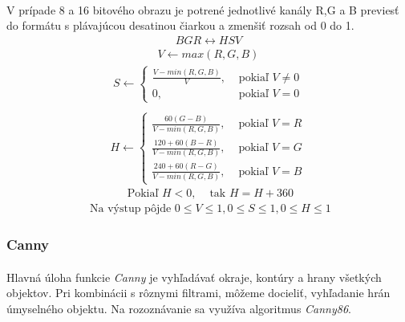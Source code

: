 \documentclass[12pt]{article}
\begin{document}
\paragraph{} 
V prípade 8 a 16 bitového obrazu je potrené jednotlivé kanály R,G a B previesť do formátu s plávajúcou desatinou čiarkou a zmenšiť rozsah od 0 do 1.
\begin{align*}
BGR \leftrightarrow HSV
\end{align*}
\begin{align*}
V \leftarrow max(R,G,B)
\end{align*}
\begin{align*}
S \leftarrow \begin{cases} \frac{V - min(R,G,B)}{V}, & \text{ pokiaľ } V \neq 0 \\ 0, & \text{ pokiaľ } V = 0 \end{cases} \\
\end{align*}
\begin{align*}
H \leftarrow \begin{cases} \frac{60(G - B)}{V - min(R,G,B)}, & \text{ pokiaľ } V = R \\ \frac{120 + 60(B - R)}{V - min(R,G,B)}, & \text{ pokiaľ } V = G \\ \frac{240 + 60(R - G)}{V - min(R,G,B)}, & \text{ pokiaľ } V = B \end{cases} 
\end{align*}
\begin{align*}
\text{ Pokiaľ } H < 0, & \text{ tak } H = H + 360
\end{align*}
\begin{align*}
\text{ Na výstup pôjde } 0 \le V \le 1, 0 \le S \le 1, 0 \le H \le 1
\end{align*}
\subsubsection{Canny}
\paragraph{}
Hlavná úloha funkcie \emph{Canny} je vyhľadávať okraje, kontúry a hrany všetkých objektov. Pri kombinácii s rôznymi filtrami, môžeme docieliť, vyhľadanie hrán úmyselného objektu.
Na rozoznávanie sa využíva algoritmus \emph{Canny86}.
\cite{canny, OpenCVDoc}
\end{document}
